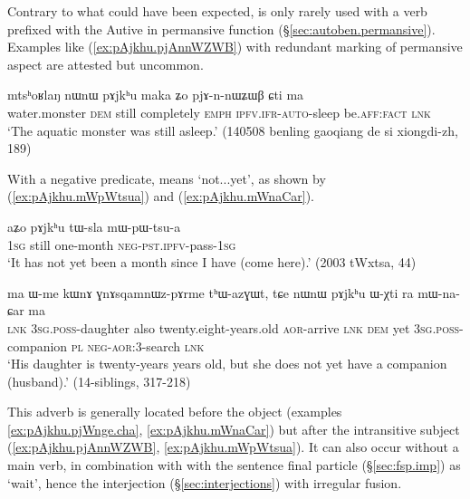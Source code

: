  Contrary to what could have been expected,  is only rarely used with a verb prefixed with the Autive in permansive function (§\ref{sec:autoben.permansive}). Examples like (\ref{ex:pAjkhu.pjAnnWZWB}) with redundant marking of permansive aspect are attested but uncommon.
 
\begin{exe}
\ex \label{ex:pAjkhu.pjAnnWZWB}
\gll mtsʰoʁlaŋ nɯnɯ pɤjkʰu maka ʑo pjɤ-n-nɯʑɯβ ɕti ma \\
water.monster \textsc{dem} still completely \textsc{emph} \textsc{ipfv}.\textsc{ifr}-\textsc{auto}-sleep be.\textsc{aff}:\textsc{fact} \textsc{lnk} \\
\glt `The aquatic monster was still  asleep.' (140508 benling gaoqiang de si xiongdi-zh, 189)
  \end{exe}
 
 With a negative predicate,  means `not...yet', as shown by (\ref{ex:pAjkhu.mWpWtsua}) and (\ref{ex:pAjkhu.mWnaCar}).
 
\begin{exe}
\ex \label{ex:pAjkhu.mWpWtsua}
\gll aʑo pɤjkʰu tɯ-sla mɯ-pɯ-tsu-a \\
 \textsc{1sg} still one-month \textsc{neg}-\textsc{pst}.\textsc{ipfv}-pass-\textsc{1sg} \\
 \glt `It has not yet been a month since I have (come here).' (2003 tWxtsa, 44)
\end{exe}

\begin{exe}
\ex \label{ex:pAjkhu.mWnaCar}
\gll ma ɯ-me kɯnɤ ɣnɤsqamnɯz-pɤrme tʰɯ-azɣɯt, tɕe nɯnɯ pɤjkʰu ɯ-χti ra mɯ-na-ɕar ma \\
\textsc{lnk} \textsc{3sg}.\textsc{poss}-daughter also twenty.eight-years.old \textsc{aor}-arrive \textsc{lnk} \textsc{dem} yet \textsc{3sg}.\textsc{poss}-companion \textsc{pl} \textsc{neg}-\textsc{aor}:3\flobv{}-search \textsc{lnk} \\
\glt `His daughter is twenty-years years old, but she does not yet have a companion (husband).' (14-siblings, 317-218)
\end{exe}

This adverb is generally located before the object (examples \ref{ex:pAjkhu.pjWnge.cha}, \ref{ex:pAjkhu.mWnaCar}) but after the intransitive subject (\ref{ex:pAjkhu.pjAnnWZWB}, \ref{ex:pAjkhu.mWpWtsua}).  It can also occur without a main verb, in combination with with the sentence final particle  (§\ref{sec:fsp.imp}) as  `wait', hence the interjection  (§\ref{sec:interjections}) with irregular fusion.
  
